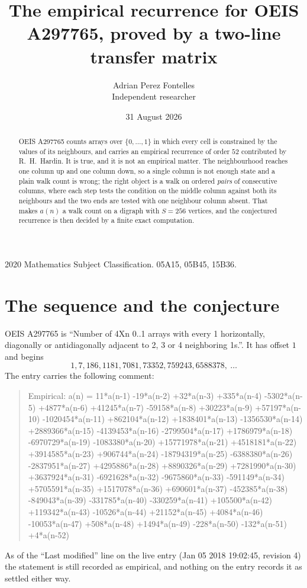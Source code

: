 \documentclass[11pt,a4paper]{article}
\title{The empirical recurrence for OEIS A297765, proved by a two-line transfer matrix}
\author{Adrian Perez Fontelles\\ \small Independent researcher}
\date{31 August 2026}
\theoremstyle{plain}
\theoremstyle{definition}
\begin{document}
\maketitle

\begin{abstract}
OEIS A297765 counts arrays over $\{0,\dots,1\}$ in which every cell is constrained by the
values of its neighbours, and carries an empirical recurrence of order $52$ contributed
by R.~H.~Hardin. It is true, and it is not an empirical matter. The neighbourhood reaches one
column up and one column down, so a single column is not enough state and a plain walk count
is wrong; the right object is a walk on ordered \emph{pairs} of consecutive columns, where
each step tests the condition on the middle column against both its neighbours and the two
ends are tested with one neighbour column absent. That makes $a(n)$ a walk count on a digraph
with $S=256$ vertices, and the conjectured recurrence is then decided by a finite exact
computation.
\end{abstract}

\noindent\small 2020 Mathematics Subject Classification. 05A15, 05B45, 15B36.\normalsize

\section{The sequence and the conjecture}

OEIS A297765 is ``Number of 4Xn 0..1 arrays with every 1 horizontally, diagonally or antidiagonally adjacent to 2, 3 or 4 neighboring 1s.''. It has offset $1$ and begins
\[
1, 7, 186, 1181, 7081, 73352, 759243, 6588378,\ \dots
\]
The entry carries the following comment:
\begin{quote}\small
Empirical: a(n) = 11*a(n-1) -19*a(n-2) +32*a(n-3) +335*a(n-4) -5302*a(n-5) +4877*a(n-6) +41245*a(n-7) -59158*a(n-8) +30223*a(n-9) +57197*a(n-10) -1020454*a(n-11) +862104*a(n-12) +1838401*a(n-13) -1356530*a(n-14) +2889366*a(n-15) -4139453*a(n-16) -2799504*a(n-17) +1786979*a(n-18) -6970729*a(n-19) -1083380*a(n-20) +15771978*a(n-21) +4518181*a(n-22) +3914585*a(n-23) +906744*a(n-24) -18794319*a(n-25) -6388380*a(n-26) -2837951*a(n-27) +4295886*a(n-28) +8890326*a(n-29) +7281990*a(n-30) +3637924*a(n-31) -6921628*a(n-32) -9675860*a(n-33) -591149*a(n-34) +5705591*a(n-35) +1517078*a(n-36) +690601*a(n-37) -452385*a(n-38) -849043*a(n-39) -331785*a(n-40) -330259*a(n-41) +105500*a(n-42) +119342*a(n-43) -10526*a(n-44) +21152*a(n-45) +4084*a(n-46) -10053*a(n-47) +508*a(n-48) +1494*a(n-49) -228*a(n-50) -132*a(n-51) +4*a(n-52)
\end{quote}
As of the ``Last modified'' line on the live entry (Jan 05 2018 19:02:45, revision 4) the statement is
still recorded as empirical, and nothing on the entry records it as settled either way.
\end{document}

